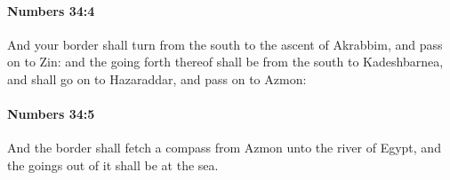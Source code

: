 		\paragraph{Numbers 34:4} %
			\label{NUMBERS-34-4}

			And your border shall turn from the south to the ascent of Akrabbim, and pass on to Zin: and the going forth thereof shall be from the south to Kadeshbarnea, and shall go on to Hazaraddar, and pass on to Azmon:


		\paragraph{Numbers 34:5} %
			\label{NUMBERS-34-5}

			And the border shall fetch a compass from Azmon unto the river of Egypt, and the goings out of it shall be at the sea.


